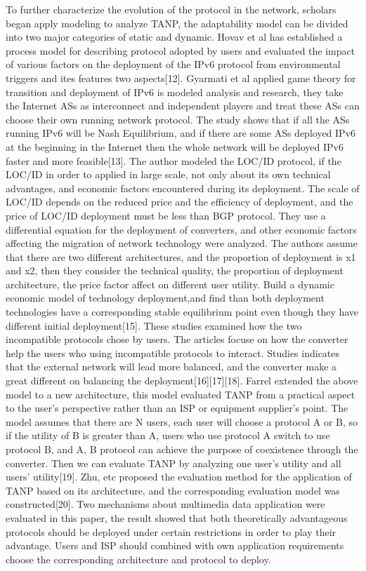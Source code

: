 \documentclass{article}
\begin{document}
To further characterize the evolution of the protocol in the network, scholars began apply modeling to analyze TANP, the adaptability 
model can be divided into two major categories of static and dynamic. Hovav et al has established a process model for describing 
protocol adopted by users and evaluated the impact of various factors on the deployment of the IPv6 protocol from environmental 
triggers and ites features two aspects[12]. Gyarmati et al applied game theory for transition and deployment of IPv6 is modeled 
analysis and research, they take the Internet ASs as interconnect and independent players and treat these ASs can choose their 
own running network protocol. The study shows that if all the ASs running IPv6 will be Nash Equilibrium, and if there are some 
ASs deployed IPv6 at the beginning in the Internet then the whole network will be deployed IPv6 faster and more feasible[13]. 
The author modeled the LOC/ID protocol, if the LOC/ID in order to applied in large scale, not only about its own technical advantages, 
and economic factors encountered during its deployment. The scale of LOC/ID depends on the reduced price and the efficiency of deployment, 
and the price of LOC/ID deployment must be less than BGP protocol. They use a differential equation for the deployment of converters, 
and other economic factors affecting the migration of network technology were analyzed.  The authors assume that there are two 
different architectures, and the proportion of deployment is x1 and x2, then they consider the technical quality, the proportion 
of deployment architecture, the price factor affect on different user utility. Build a dynamic economic model of technology 
deployment,and find than both deployment technologies have a corresponding stable equilibrium point  even though they have 
different initial deployment[15]. These studies examined how the two incompatible protocols chose by users. The articles focuse 
on how the converter help the users who using incompatible protocols to interact. Studies indicates that the external network 
will lead more balanced, and the converter make a great different on balancing the deployment[16][17][18]. Farrel extended the 
above model to a new architecture,  this model evaluated TANP from a practical aspect to the user's perspective rather than 
an ISP or equipment supplier's point. The model assumes that there are N users, each user will choose a protocol A or B, 
so if the utility of B is greater than A, users who use protocol A switch to use protocol B, and A, B protocol can achieve 
the purpose of coexistence through the converter. Then we can evaluate TANP by analyzing one user's utility and all 
users' utility[19]. Zhu, etc proposed the evaluation method for the application of TANP based on its architecture,  
and the corresponding evaluation model was constructed[20]. Two mechanisms about multimedia data application were evaluated 
in this paper, the result showed that both theoretically advantageous protocols should be deployed under certain restrictions 
in order to play their advantage. Users and ISP should combined with own application requirements choose the corresponding 
architecture and protocol to deploy.
\end{document}
